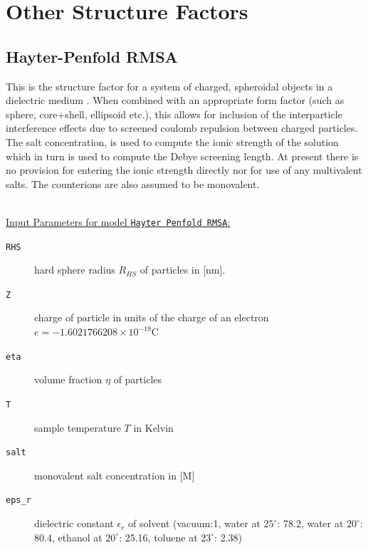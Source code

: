\clearpage
\section{Other Structure Factors}

\subsection{Hayter-Penfold RMSA }

This is the structure factor for a system of charged, spheroidal objects in a dielectric
medium \cite{Hayter1981,Hansen1982}. When
combined with an appropriate form factor (such as sphere, core+shell, ellipsoid etc.),
this allows for inclusion of the interparticle interference effects due to screened
coulomb repulsion between charged particles.
The salt concentration, is used to compute the ionic strength of the solution which
in turn is used to compute the Debye screening length. At present there is no provision
for entering the ionic strength directly nor for use of any multivalent salts. The
counterions are also assumed to be monovalent.



\hspace{1pt}\\
\underline{Input Parameters for model \texttt{Hayter Penfold RMSA}:}\\
\begin{description}
\item[\texttt{RHS}] hard sphere radius $R_{HS}$ of particles in [nm].
\item[\texttt{Z}] charge of particle in units of the charge of an electron $e=-1.602 176 620 8 \times 10^{-19} \mathrm{C}$
\item[\texttt{eta}] volume fraction $\eta$ of particles
\item[\texttt{T}] sample temperature $T$ in Kelvin
\item[\texttt{salt}] monovalent salt concentration in [M]
\item[\texttt{eps\_r}] dielectric constant $\epsilon_r$ of solvent (vacuum:1, water at $25^\circ$: 78.2, water at $20^\circ$: 80.4, ethanol at $20^\circ$: 25.16, toluene at $23^\circ$: 2.38)
\end{description}


